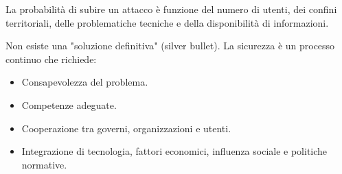 \documentclass[a4paper,12pt]{article}
\begin{document}
La probabilità di subire un attacco è funzione del numero di utenti, dei confini territoriali, delle problematiche tecniche e della disponibilità di informazioni.

Non esiste una "soluzione definitiva" (silver bullet). La sicurezza è un processo continuo che richiede:
\begin{itemize}
    \item Consapevolezza del problema.
    \item Competenze adeguate.
    \item Cooperazione tra governi, organizzazioni e utenti.
    \item Integrazione di tecnologia, fattori economici, influenza sociale e politiche normative.
\end{itemize}
\end{document}
